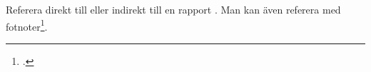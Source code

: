 \documentclass{article}
\begin{document}
  \thispagestyle{empty}
  \begin{preview}\begin{minipage}{0.9\textwidth}
  	Referera direkt till \textcite{Friedman01}
  	eller indirekt till en rapport \parencite{Friedman01}.
  	Man kan även referera med fotnoter\footcite{Friedman01}.
  	\printbibliography
  \end{minipage}\end{preview}
\end{document}

